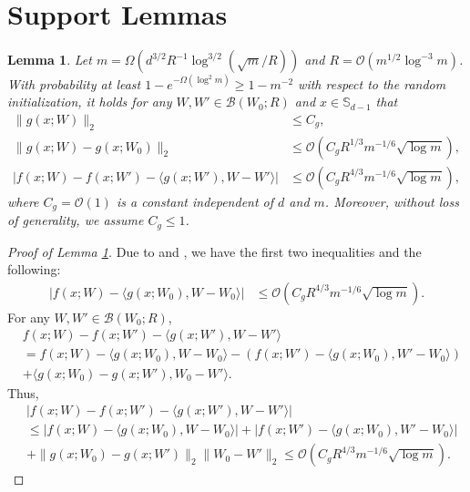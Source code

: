 \documentclass{article} \usepackage{iclr2023/iclr2023_conference,times}
\newtheorem{lemma}{Lemma}[section]
\begin{document}
 \section{Support Lemmas}
\begin{lemma}


Let $m = \Omega \left( d^{3/2}  R^{-1} \log^{3/2} (\sqrt{m} / R) \right)$ and $R = \mathcal{O} \left( m^{1/2} \log^{-3} m \right)$. With probability at least $1 - e^{-\Omega(\log^2 m)} \geq 1 - m^{-2}$ with respect to the random initialization, it holds for any $W, W' \in \mathcal{B}(W_0; R)$ and $x \in \mathbb{S}_{d-1}$ that
\begin{align*}
    \| g(x; W) \|_2 &\leq C_g, \\ 
    \| g(x; W) - g(x; W_0) \|_2 &\leq \mathcal{O} \left( C_g R^{1/3} m^{-1/6} \sqrt{\log m} \right), \\ 
    |f(x; W) - f(x; W') - \langle g(x; W'), W - W' \rangle| &\leq \mathcal{O} \left( C_g R^{4/3} m^{-1/6} \sqrt{\log m} \right),
\end{align*}
where $C_g = \mathcal{O}(1)$ is a constant independent of $d$ and $m$. Moreover, without loss of generality, we assume $C_g \leq 1$.  
\label{lemma: NTK approximation error}
\end{lemma}
\begin{proof}[Proof of Lemma \ref{lemma: NTK approximation error}]
Due to \cite[Lemma~C.2]{yang2020function} and \cite[Lemma~F.1, F.2]{cai2019neural}, we have the first two inequalities and the following: 
\begin{align*}
    |f(x; W) - \langle g(x; W_0), W - W_0 \rangle| &\leq \mathcal{O} \left( C_g R^{4/3} m^{-1/6} \sqrt{\log m} \right).
\end{align*}
For any $W, W' \in \mathcal{B}(W_0; R)$, 
\begin{align*}
    &f(x; W) - f(x; W') - \langle g(x; W'), W - W' \rangle \\
    &= f(x; W) - \langle g(x; W_0), W - W_0 \rangle - ( f(x; W') - \langle g(x; W_0), W' - W_0 \rangle ) \\
    &+ \langle g(x; W_0) - g(x; W'), W_0 - W' \rangle. 
\end{align*}
Thus, 
\begin{align*}
    &|f(x; W) - f(x; W') - \langle g(x; W'), W - W' \rangle | \\
    &\leq |f(x; W) - \langle g(x; W_0), W - W_0 \rangle| + | f(x; W') - \langle g(x; W_0), W' - W_0 \rangle | \\
    &+  \| g(x; W_0) - g(x; W')\|_2 \| W_0 - W' \|_2 \leq  \mathcal{O} \left( C_g R^{4/3} m^{-1/6} \sqrt{\log m} \right).
\end{align*}
\end{proof}
\end{document}

